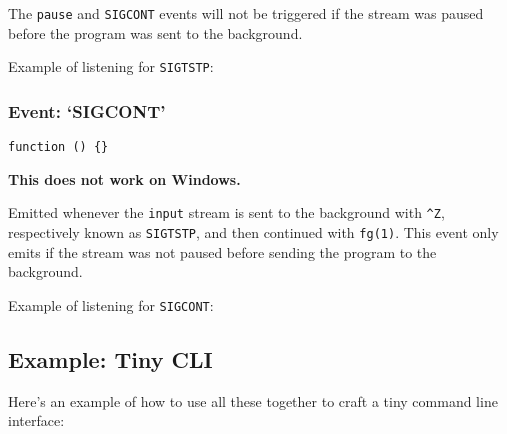 The \texttt{pause} and \texttt{SIGCONT} events will not be triggered if
the stream was paused before the program was sent to the background.

Example of listening for \texttt{SIGTSTP}:

\begin{Shaded}
\begin{Highlighting}[]
\NormalTok{(}\NormalTok{, }\NormalTok{() \{}
  \NormalTok{(}\NormalTok{);}
\NormalTok{\});}
\end{Highlighting}
\end{Shaded}

\subsubsection{Event: `SIGCONT'}

\texttt{function () \{\}}

\textbf{This does not work on Windows.}

Emitted whenever the \texttt{input} stream is sent to the background
with \texttt{\^{}Z}, respectively known as \texttt{SIGTSTP}, and then
continued with \texttt{fg(1)}. This event only emits if the stream was
not paused before sending the program to the background.

Example of listening for \texttt{SIGCONT}:

\begin{Shaded}
\begin{Highlighting}[]
\NormalTok{(}\NormalTok{, }\NormalTok{() \{}
  \NormalTok{();}
\NormalTok{\});}
\end{Highlighting}
\end{Shaded}

\subsection{Example: Tiny CLI}

Here's an example of how to use all these together to craft a tiny
command line interface:

